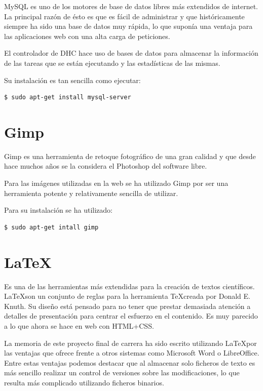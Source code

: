 MySQL es uno de los motores de base de datos libres más extendidos de internet. La principal razón de ésto es que es fácil de administrar y que históricamente siempre ha sido una base de datos muy rápida, lo que suponía una ventaja para las aplicaciones web con una alta carga de peticiones.

El controlador de DHC hace uso de bases de datos para almacenar la información de las tareas que se están ejecutando y las estadísticas de las mismas.

Su instalación es tan sencilla como ejecutar:

\begin{verbatim}
$ sudo apt-get install mysql-server
\end{verbatim}

\section{Gimp}

Gimp es una herramienta de retoque fotográfico de una gran calidad y que desde hace muchos años se la considera el Photoshop del software libre.

Para las imágenes utilizadas en la web se ha utilizado Gimp por ser una herramienta potente y relativamente sencilla de utilizar.

Para su instalación se ha utilizado:

\begin{verbatim}
$ sudo apt-get intall gimp
\end{verbatim}

\section{\LaTeX}

Es una de las herramientas más extendidas para la creación de textos científicos. \LaTeX son un conjunto de reglas para la herramienta \TeX creada por Donald E. Knuth. Su diseño está pensado para no tener que prestar demasiada atención a detalles de presentación para centrar el esfuerzo en el contenido. Es muy parecido a lo que ahora se hace en web con HTML+CSS.

La memoria de este proyecto final de carrera ha sido escrito utilizando \LaTeX por las ventajas que ofrece frente a otros sistemas como Microsoft Word o LibreOffice. Entre estas ventajas podemos destacar que al almacenar solo ficheros de texto es más sencillo realizar un control de versiones sobre las modificaciones, lo que resulta más complicado utilizando ficheros binarios.


